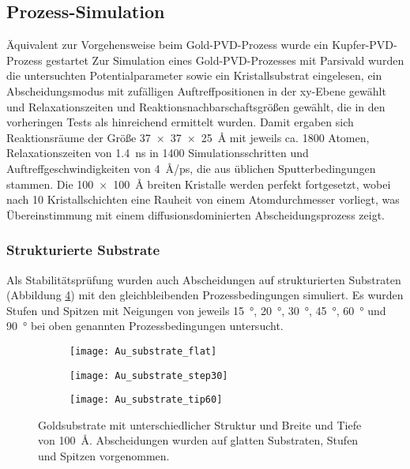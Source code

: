 \subsection{Prozess-Simulation}

Äquivalent zur Vorgehensweise beim Gold-PVD-Prozess wurde ein Kupfer-PVD-Prozess gestartet
Zur Simulation eines Gold-PVD-Prozesses mit Parsivald wurden die untersuchten Potentialparameter sowie ein Kristallsubstrat eingelesen, ein Abscheidungsmodus mit zufälligen Auftreffpositionen in der xy-Ebene gewählt und Relaxationszeiten und Reaktionsnachbarschaftsgrößen gewählt, die in den vorheringen Tests als hinreichend ermittelt wurden.
Damit ergaben sich Reaktionsräume der Größe \SI{37x37x25}{\angstrom} mit jeweils ca. 1800 Atomen, Relaxationszeiten von \SI{1.4}{\nano\second} in \SI{1400}{} Simulationsschritten und Auftreffgeschwindigkeiten von \SI{4}{\angstrom/\pico\second}, die aus üblichen Sputterbedingungen stammen.
Die \SI{100x100}{\angstrom} breiten Kristalle werden perfekt fortgesetzt, wobei nach 10 Kristallschichten eine Rauheit von einem Atomdurchmesser vorliegt, was Übereinstimmung mit einem diffusionsdominierten Abscheidungsprozess zeigt.

\subsubsection{Strukturierte Substrate}

Als Stabilitätsprüfung wurden auch Abscheidungen auf strukturierten Substraten (Abbildung \ref{fig:goldsubstrate}) mit den gleichbleibenden Prozessbedingungen simuliert.
Es wurden Stufen und Spitzen mit Neigungen von jeweils \SI{15}{\degree}, \SI{20}{\degree}, \SI{30}{\degree}, \SI{45}{\degree}, \SI{60}{\degree} und \SI{90}{\degree} bei oben genannten Prozessbedingungen untersucht.

\begin{figure}[bt]
  \captionsetup[subfigure]{singlelinecheck=false}
  \def\subfigwidth{0.31\textwidth}
  \begin{subfigure}[t]{\subfigwidth}
    \texttt{[image: Au\_substrate\_flat]}
    \label{fig:goldsubstrate-a}
  \end{subfigure}
  \hfill
  \begin{subfigure}[t]{\subfigwidth}
    \texttt{[image: Au\_substrate\_step30]}
    \label{fig:goldsubstrate-b}
  \end{subfigure}
  \hfill
  \begin{subfigure}[t]{\subfigwidth}
    \texttt{[image: Au\_substrate\_tip60]}
    \label{fig:goldsubstrate-c}
  \end{subfigure}
  \caption[Strukturierte Goldsubstrate]{Goldsubstrate mit unterschiedlicher Struktur und Breite und Tiefe von \SI{100}{\angstrom}.
    Abscheidungen wurden auf glatten Substraten, Stufen und Spitzen vorgenommen.}
  \label{fig:goldsubstrate}
\end{figure}

